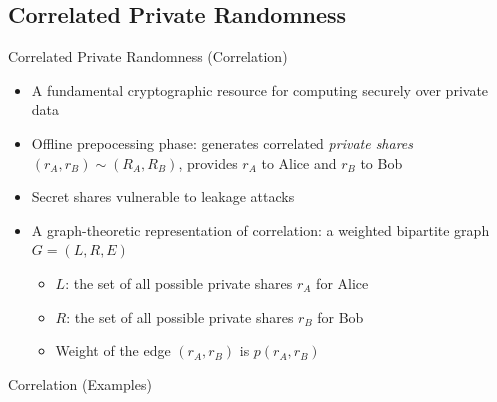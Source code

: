 \subsection{Correlated Private Randomness}
\begin{frame}{Correlated Private Randomness (Correlation)}
	\begin{itemize}
		\item A fundamental cryptographic resource for computing securely over private data
		\item Offline prepocessing phase: generates correlated {\em private shares} $ (r_A, r_B) \sim (R_A, R_B) $, provides $r_A$ to Alice and $r_B$ to Bob 
		\item Secret shares vulnerable to leakage attacks
		\item  A graph-theoretic representation of correlation: a weighted bipartite graph $  G = (L, R, E) $
		\begin{itemize}
	  		\item $ L $: the set of all possible private shares $ r_A $ for Alice
	  		\item $ R $: the set of all possible private shares $ r_B $ for Bob
			\item Weight of the edge $ (r_A, r_B) $ is  $ p(r_A, r_B) $
		\end{itemize}
	\end{itemize}
\end{frame}

\begin{frame}{Correlation (Examples)}
	
\end{frame}
		

